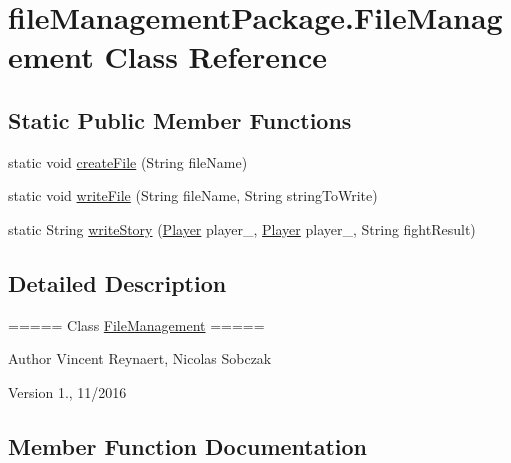 \hypertarget{classfile_management_package_1_1_file_management}{}\section{file\+Management\+Package.\+File\+Management Class Reference}
\label{classfile_management_package_1_1_file_management}
\subsection*{Static Public Member Functions}
\begin{DoxyCompactItemize}
\item 
static void \hyperlink{classfile_management_package_1_1_file_management_ad3a42063ba99652ab0e8d8c1dfb49e3f}{create\+File} (String file\+Name)
\item 
static void \hyperlink{classfile_management_package_1_1_file_management_a70b71f4b284159b6260371e9bf59e223}{write\+File} (String file\+Name, String string\+To\+Write)
\item 
static String \hyperlink{classfile_management_package_1_1_file_management_ac41c76736949f19bd6b2b5f862211805}{write\+Story} (\hyperlink{classplayer_package_1_1_player}{Player} player\+\_, \hyperlink{classplayer_package_1_1_player}{Player} player\+\_, String fight\+Result)
\end{DoxyCompactItemize}


\subsection{Detailed Description}
===== Class \hyperlink{classfile_management_package_1_1_file_management}{File\+Management} =====

\begin{DoxyAuthor}{Author}
Vincent Reynaert, Nicolas Sobczak 
\end{DoxyAuthor}
\begin{DoxyVersion}{Version}
1., 11/2016 
\end{DoxyVersion}


\subsection{Member Function Documentation}
